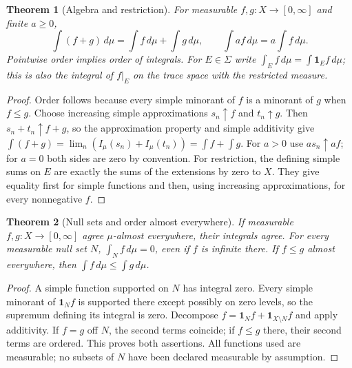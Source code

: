 \documentclass[11pt,oneside,openany]{book}
\newtheorem{theorem}{Theorem}[chapter]
\theoremstyle{definition}
\theoremstyle{remark}
\newcommand{\one}{\mathbf1}\newcommand{\ind}[1]{\mathbf1_{#1}}
\newcommand{\Eplus}{[0,\infty]}
\newcommand{\family}[1]{}
\begin{document}
\begin{theorem}[Algebra and restriction]
\family{D11.05.nonnegative_algebra}\label{d11:05:nonnegative-algebra}
For measurable $f,g:X\to\Eplus$ and finite $a\geq0$,
\[
 \int(f+g)\,d\mu=\int f\,d\mu+\int g\,d\mu,
 \qquad \int af\,d\mu=a\int f\,d\mu.
\]
Pointwise order implies order of integrals. For $E\in\Sigma$ write
$\int_E f\,d\mu=\int\one_Ef\,d\mu$; this is also the integral of $f|_E$
on the trace space with the restricted measure.
\end{theorem}
\begin{proof}
Order follows because every simple minorant of $f$ is a minorant of $g$
when $f\leq g$. Choose increasing simple approximations $s_n\uparrow f$
and $t_n\uparrow g$. Then $s_n+t_n\uparrow f+g$, so the approximation
property and simple additivity give
$\int(f+g)=\lim_n(I_\mu(s_n)+I_\mu(t_n))=\int f+\int g$.
For $a>0$ use $as_n\uparrow af$; for $a=0$ both sides are zero by convention.
For restriction, the defining simple sums on $E$ are exactly the sums of the
extensions by zero to $X$. They give equality first for simple functions and
then, using increasing approximations, for every nonnegative $f$.
\end{proof}

\begin{theorem}[Null sets and order almost everywhere]
\family{D11.05.null_invariance}\label{d11:05:null-invariance}
If measurable $f,g:X\to\Eplus$ agree $\mu$-almost everywhere, their
integrals agree. For every measurable null set $N$, $\int_N f\,d\mu=0$,
even if $f$ is infinite there. If $f\leq g$ almost everywhere, then
$\int f\,d\mu\leq\int g\,d\mu$.
\end{theorem}
\begin{proof}
A simple function supported on $N$ has integral zero. Every simple
minorant of $\one_Nf$ is supported there except possibly on zero levels,
so the supremum defining its integral is zero. Decompose
$f=\one_Nf+\one_{X\setminus N}f$ and apply additivity. If $f=g$ off $N$,
the second terms coincide; if $f\leq g$ there, their second terms are
ordered. This proves both assertions. All functions used are measurable;
no subsets of $N$ have been declared measurable by assumption.
\end{proof}
\end{document}
